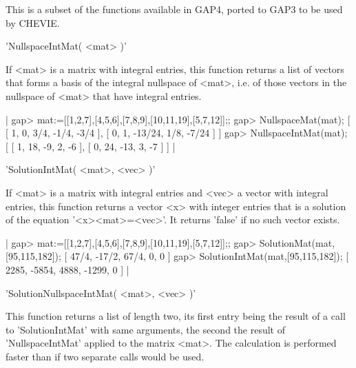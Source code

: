 
This is a subset of the functions available in GAP4, ported to GAP3 to be
used by CHEVIE.

'NullspaceIntMat( <mat> )'

If <mat> is a matrix with integral entries, this function returns a list of
vectors  that forms  a basis  of the  integral nullspace  of <mat>, i.e. of
those vectors in the nullspace of <mat> that have integral entries.

|    gap> mat:=[[1,2,7],[4,5,6],[7,8,9],[10,11,19],[5,7,12]];;
    gap> NullspaceMat(mat);
    [ [ 1, 0, 3/4, -1/4, -3/4 ], [ 0, 1, -13/24, 1/8, -7/24 ] ]
    gap> NullspaceIntMat(mat);
    [ [ 1, 18, -9, 2, -6 ], [ 0, 24, -13, 3, -7 ] ] |

'SolutionIntMat( <mat>, <vec> )'

If <mat> is a matrix with integral entries and <vec> a vector with integral
entries,  this function returns a vector <x> with integer entries that is a
solution  of the equation '<x>\*<mat>=<vec>'. It returns 'false' if no such
vector exists.

|    gap> mat:=[[1,2,7],[4,5,6],[7,8,9],[10,11,19],[5,7,12]];;
    gap> SolutionMat(mat,[95,115,182]);
    [ 47/4, -17/2, 67/4, 0, 0 ]
    gap> SolutionIntMat(mat,[95,115,182]);
    [ 2285, -5854, 4888, -1299, 0 ] |

'SolutionNullspaceIntMat( <mat>, <vec> )'

This  function returns  a list  of length  two, its  first entry  being the
result  of a call  to 'SolutionIntMat' with  same arguments, the second the
result of 'NullspaceIntMat' applied to the matrix <mat>. The calculation is
performed faster than if two separate calls would be used.

